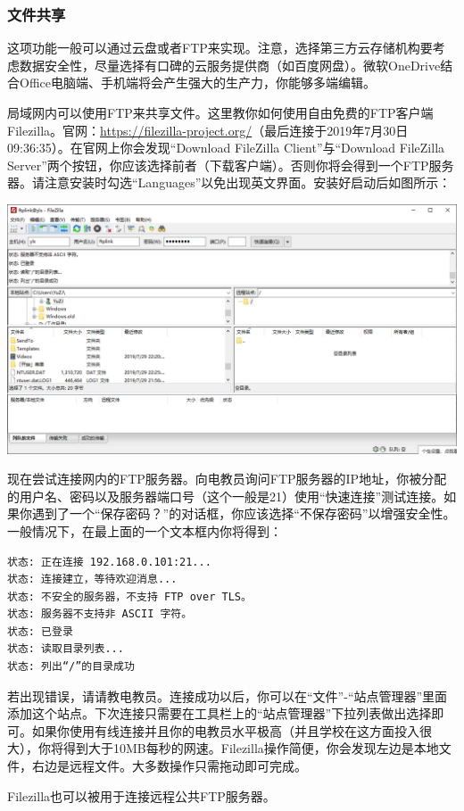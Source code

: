 \subsubsection{文件共享}
这项功能一般可以通过云盘或者FTP来实现。注意，选择第三方云存储机构要考虑数据安全性，尽量选择有口碑的云服务提供商（如百度网盘）。微软OneDrive结合Office电脑端、手机端将会产生强大的生产力，你能够多端编辑。\par
局域网内可以使用FTP来共享文件。这里教你如何使用自由免费的FTP客户端Filezilla。官网：\url{https://filezilla-project.org/}（最后连接于2019年7月30日09:36:35）。在官网上你会发现“Download FileZilla Client”与“Download FileZilla Server”两个按钮，你应该选择前者（下载客户端）。否则你将会得到一个FTP服务器。请注意安装时勾选“Languages”以免出现英文界面。安装好启动后如图所示：\par
\begin{center}
	\includegraphics[scale=0.5]{pic/fz}
\end{center} \par
现在尝试连接网内的FTP服务器。向电教员询问FTP服务器的IP地址，你被分配的用户名、密码以及服务器端口号（这个一般是21）使用“快速连接”测试连接。如果你遇到了一个“保存密码？”的对话框，你应该选择“不保存密码”以增强安全性。一般情况下，在最上面的一个文本框内你将得到：
\begin{verbatim}
状态:	正在连接 192.168.0.101:21...
状态:	连接建立，等待欢迎消息...
状态:	不安全的服务器，不支持 FTP over TLS。
状态:	服务器不支持非 ASCII 字符。
状态:	已登录
状态:	读取目录列表...
状态:	列出“/”的目录成功
\end{verbatim}
若出现错误，请请教电教员。连接成功以后，你可以在“文件”-“站点管理器”里面添加这个站点。下次连接只需要在工具栏上的“站点管理器”下拉列表做出选择即可。如果你使用有线连接并且你的电教员水平极高（并且学校在这方面投入很大），你将得到大于10MB每秒的网速。Filezilla操作简便，你会发现左边是本地文件，右边是远程文件。大多数操作只需拖动即可完成。\par
Filezilla也可以被用于连接远程公共FTP服务器。
